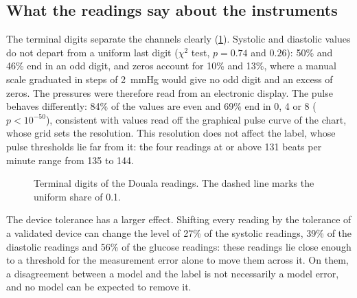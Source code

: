\documentclass[11pt,a4paper,oneside]{report}
\begin{document}
\subsection{What the readings say about the instruments}

The terminal digits separate the channels clearly (\cref{fig:terminal-digits}). Systolic and diastolic values do not depart from a uniform last digit ($\chi^2$ test, $p = 0.74$ and $0.26$): 50\% and 46\% end in an odd digit, and zeros account for 10\% and 13\%, where a manual scale graduated in steps of 2~mmHg would give no odd digit and an excess of zeros. The pressures were therefore read from an electronic display. The pulse behaves differently: 84\% of the values are even and 69\% end in 0, 4 or 8 ($p < 10^{-50}$), consistent with values read off the graphical pulse curve of the chart, whose grid sets the resolution. This resolution does not affect the label, whose pulse thresholds lie far from it: the four readings at or above 131 beats per minute range from 135 to 144.

\begin{figure}[htbp]
\centering
{}
\caption{Terminal digits of the Douala readings. The dashed line marks the uniform share of 0.1.}\label{fig:terminal-digits}
\end{figure}

The device tolerance has a larger effect. Shifting every reading by the tolerance of a validated device can change the level of 27\% of the systolic readings, 39\% of the diastolic readings and 56\% of the glucose readings: these readings lie close enough to a threshold for the measurement error alone to move them across it. On them, a disagreement between a model and the label is not necessarily a model error, and no model can be expected to remove it.
\end{document}
